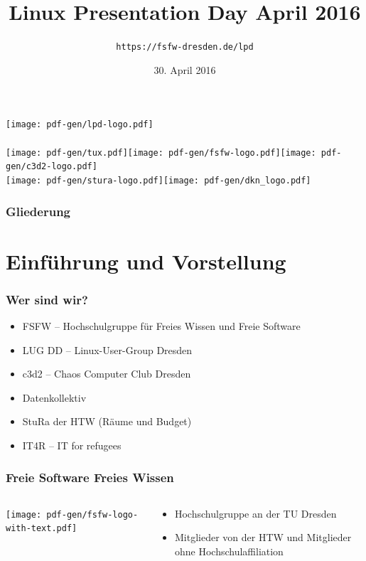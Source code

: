 \documentclass[t]{beamer}
\title{Linux Presentation Day April 2016}
\author{\texttt{https://fsfw-dresden.de/lpd}}
\date[30.04.2016]{30. April 2016}
\begin{document}
\begin{frame}
  \begin{center}%
\texttt{[image: pdf-gen/lpd-logo.pdf]}\\%
\vspace{0.5cm}\\
{\texttt{[image: pdf-gen/tux.pdf]}\hspace{0.5cm}\texttt{[image: pdf-gen/fsfw-logo.pdf]}\hspace{0.5cm}\texttt{[image: pdf-gen/c3d2-logo.pdf]}\\[0.1cm]
\texttt{[image: pdf-gen/stura-logo.pdf]}}\hspace{0.5cm}\texttt{[image: pdf-gen/dkn\_logo.pdf]}
  \end{center}
\end{frame}

\begin{frame}
  \frametitle{Gliederung}
  \tableofcontents
\end{frame}

\section{Einführung und Vorstellung}
\begin{frame}
  \frametitle{Wer sind wir?}
  \begin{itemize}
  \item FSFW – Hochschulgruppe für Freies Wissen und Freie Software
  \item LUG DD – Linux-User-Group Dresden
  \item c3d2 – Chaos Computer Club Dresden
  \item Datenkollektiv
  \item StuRa der HTW (Räume und Budget)
  \item IT4R – IT for refugees
  \end{itemize}
\end{frame}

\begin{frame}
  \frametitle{Freie Software Freies Wissen}
  \begin{columns}
    \begin{column}[T]{0.45\textwidth}
      \texttt{[image: pdf-gen/fsfw-logo-with-text.pdf]}
    \end{column}
    \begin{column}{0.45\textwidth}
      \begin{itemize}
      \item Hochschulgruppe an der TU Dresden
      \item Mitglieder von der HTW und Mitglieder ohne Hochschulaffiliation
      \end{itemize}
    \end{column}
  \end{columns}
\end{frame}
\end{document}
